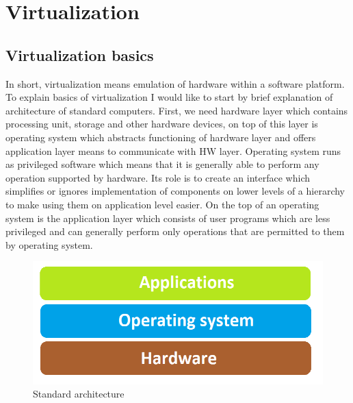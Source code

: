 \chapter{Virtualization} 
\label{chap_virtualization}

\section{Virtualization basics}
In short, virtualization means emulation of hardware within a software platform. To explain basics of virtualization I would like to start by brief explanation of architecture of standard computers. First, we need hardware layer which contains processing unit, storage and other hardware devices, on top of this layer is operating system which abstracts functioning of hardware layer and offers application layer means to communicate with HW layer. Operating system runs as privileged software which means that it is generally able to perform any operation supported by hardware. Its role is to create an interface which simplifies or ignores implementation of components on lower levels of a hierarchy to make using them on application level easier. On the top of an operating system is the application layer which consists of user programs which are less privileged and can generally perform only operations that are permitted to them by operating system.

\begin{figure}[H]
\centering
\includegraphics[scale=0.5]{klasika.png}
\caption{Standard architecture}
\end{figure}

